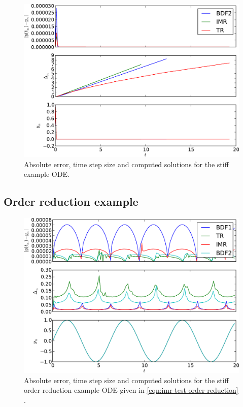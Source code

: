 \begin{figure}
  \centering
  \includegraphics[width=1\textwidth]{plots/aimr_odes/simple_stiff-errornormsvs-dtsvs-tracevaluesvstimes}
  \caption{Absolute error, time step size and computed solutions for the stiff example ODE.}
  \label{fig:imr-stiff-example}
\end{figure}


\subsection{Order reduction example}
\label{sec:order-reduct-example}

\begin{figure}
  \centering  \includegraphics[width=1\textwidth]{plots/aimr_odes/strong_order_reduction-errornormsvs-dtsvs-tracevaluesvstimes}
  \caption{Absolute error, time step size and computed solutions for the stiff order reduction example ODE given in \cref{eqn:imr-test-order-reduction}
    .}
  \label{fig:imr-order-reduction-example}
\end{figure}

